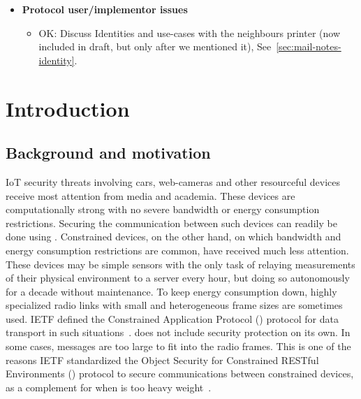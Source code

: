 \documentclass[runningheads,draft,x11names]{llncs}
\begin{document}
{\begin{itemize}
\begin{itemize}
\begin{itemize}
                confirmation and hence explicit inj-agree also for $I$.
                \item Discuss Transcipt hashes that lag behind one message and that
                it is supposed to "cover as much as possible", but sometimes
                does not (check tamarin model also for inconsistencies between
                methods). Unclear design except "as much as possible".
                \end{itemize}
            \item{\textbf{Protocol user/implementor issues}}
                \begin{itemize}
                \item OK: Discuss Identities and use-cases with the neighbours printer
                (now included in draft, but only after we mentioned it),
                See~\ref{sec:mail-notes-identity}.
                \end{itemize}
        \end{itemize}
\end{itemize}
}
\fi %

\section{Introduction}
\label{sec:introduction}
\subsection{Background and motivation}
\label{sec:motivation}
IoT security threats involving cars, web-cameras and other resourceful devices
receive most attention from media and academia.
%
These devices are computationally strong with no severe bandwidth or energy
consumption restrictions.
%
Securing the communication between such devices can readily be done using
\mDandTls.
%
Constrained devices, on the other hand, on which bandwidth and
energy consumption restrictions are common, have received much less attention.
%
These devices may be simple sensors with the only task of relaying
measurements of their physical environment to a server every hour, but doing so
autonomously for a decade without maintenance.
%
To keep energy consumption down, highly specialized radio links with small
and heterogeneous frame sizes are sometimes used.
%
IETF defined the Constrained Application Protocol (\mCoap{}) protocol for data
transport in such situations~\cite{rfc7252}.
%
\mCoap{} does not include security protection on its own.
%
In some cases, \mDandTls{} messages are too large to fit into the radio frames.
%
This is one of the reasons IETF standardized the Object Security for
Constrained RESTful Environments (\mOscore{}) protocol to secure
communications between constrained devices, as a complement for when
\mDandTls{} is too heavy weight~\cite{rfc8613}.
%
\end{document}
